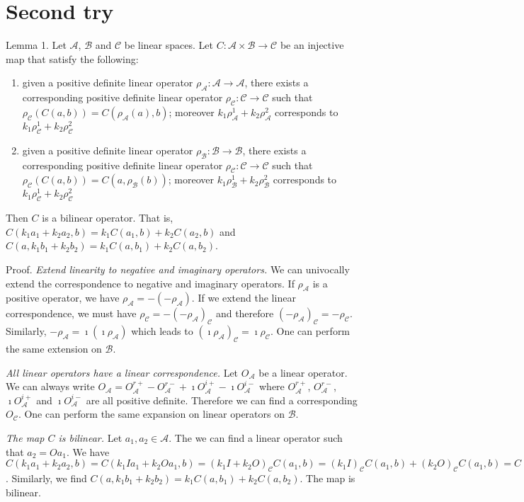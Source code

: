 \documentclass{article}
\begin{document}
\section{Second try}

Lemma 1. Let $\mathcal{A}$, $\mathcal{B}$ and $\mathcal{C}$ be linear spaces. Let $C : \mathcal{A} \times \mathcal{B} \to \mathcal{C}$ be an injective map that satisfy the following:
\begin{enumerate}
	\item given a positive definite linear operator $\rho_\mathcal{A} : \mathcal{A} \to \mathcal{A}$, there exists a corresponding positive definite linear operator $\rho_\mathcal{C} : \mathcal{C} \to \mathcal{C}$ such that $\rho_\mathcal{C}(C(a,b)) = C(\rho_\mathcal{A}(a),b)$; moreover $k_1\rho_\mathcal{A}^1 + k_2\rho_\mathcal{A}^2$ corresponds to $k_1\rho_\mathcal{C}^1 + k_2\rho_\mathcal{C}^2$
	\item given a positive definite linear operator $\rho_\mathcal{B} : \mathcal{B} \to \mathcal{B}$, there exists a corresponding positive definite linear operator $\rho_\mathcal{C} : \mathcal{C} \to \mathcal{C}$ such that $\rho_\mathcal{C}(C(a,b)) = C(a,\rho_\mathcal{B}(b))$; moreover $k_1\rho_\mathcal{B}^1 + k_2\rho_\mathcal{B}^2$ corresponds to $k_1\rho_\mathcal{C}^1 + k_2\rho_\mathcal{C}^2$
\end{enumerate}
Then $C$ is a bilinear operator. That is, $C(k_1a_1 + k_2a_2, b)=k_1C(a_1, b) + k_2C(a_2, b)$ and $C(a, k_1b_1 + k_2b_2)=k_1C(a, b_1) + k_2C(a, b_2)$.

Proof. \emph{Extend linearity to negative and imaginary operators.} We can univocally extend the correspondence to negative and imaginary operators. If $\rho_\mathcal{A}$ is a positive operator, we have $\rho_\mathcal{A} = - (-\rho_\mathcal{A})$. If we extend the linear correspondence, we must have $\rho_\mathcal{C} = - (-\rho_\mathcal{A})_\mathcal{C}$ and therefore $(-\rho_\mathcal{A})_\mathcal{C} = - \rho_\mathcal{C}$. Similarly, $- \rho_\mathcal{A} = \imath (\imath \rho_\mathcal{A})$ which leads to $(\imath \rho_\mathcal{A})_\mathcal{C} = \imath \rho_\mathcal{C}$. One can perform the same extension on $\mathcal{B}$.

\emph{All linear operators have a linear correspondence.} Let $O_\mathcal{A}$ be a linear operator. We can always write $O_\mathcal{A} = O_\mathcal{A}^{r+} - O_\mathcal{A}^{r-} + \imath O_\mathcal{A}^{i+} - \imath O_\mathcal{A}^{i-}$ where  $O_\mathcal{A}^{r+}$, $O_\mathcal{A}^{r-}$, $\imath O_\mathcal{A}^{i+}$ and $\imath O_\mathcal{A}^{i-}$ are all positive definite. Therefore we can find a corresponding $O_\mathcal{C}$. One can perform the same expansion on linear operators on $\mathcal{B}$.

\emph{The map $C$ is bilinear.} Let $a_1, a_2 \in \mathcal{A}$. The we can find a linear operator such that $a_2 = O a_1$. We have $C(k_1 a_1 + k_2 a_2, b) = C(k_1 I a_1 + k_2 O a_1, b) = (k_1 I + k_2 O)_\mathcal{C}C(a_1, b) = (k_1 I)_\mathcal{C}C(a_1, b) + (k_2 O)_\mathcal{C}C(a_1, b) = C(k_1 I a_1, b) + C(k_2 O a_1, b)  = C(k_1 a, b) + C(k_2 a_2, b)$. Similarly, we find $C(a, k_1b_1 + k_2b_2)=k_1C(a, b_1) + k_2C(a, b_2)$. The map is bilinear.
\end{document}
